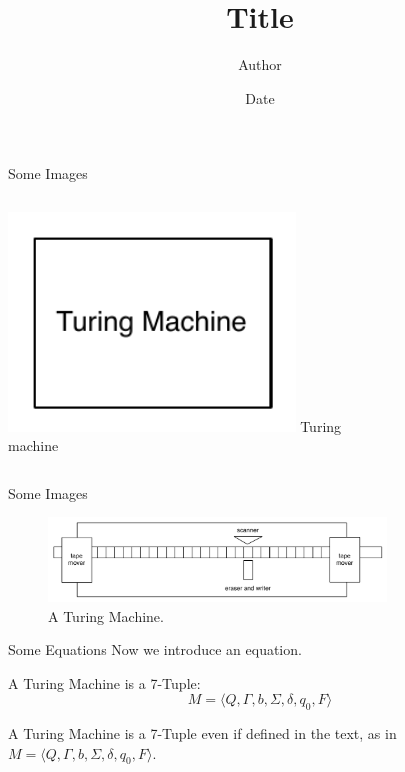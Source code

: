 \documentclass[aspectratio=169]{beamer}
\title              {Title}
\author             {Author}
\institute          {Institute, University of Basel}
\date               {Date}
\begin{document}
\begin{frame}[t,plain]
\titlepage
\end{frame}


\begin{frame}[c]{Some Images}
\begin{columns}[c]
            \includegraphics[width=0.8\textwidth]{block}
            Turing machine
\end{columns}
\end{frame}


\begin{frame}[c]{Some Images}
    \begin{figure}
        \includegraphics[width=0.8\textwidth]{turingmachine}
        \caption{A Turing Machine.}
    \end{figure}
\end{frame}


\begin{frame}[c]{Some Equations}
Now we introduce an equation.
\begin{theorem}
A Turing Machine is a 7-Tuple:
\begin{equation}
    M = \langle Q, \Gamma, b, \Sigma, \delta, q_0, F \rangle
\end{equation}
\end{theorem}
A Turing Machine is a 7-Tuple even if defined in the text, as in $M = \langle Q, \Gamma, b, \Sigma, \delta, q_0, F \rangle$.
\end{frame}
\end{document}
